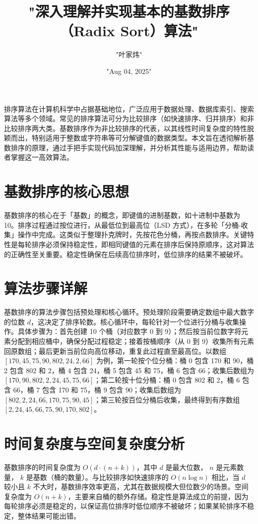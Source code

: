 \title{"深入理解并实现基本的基数排序（Radix Sort）算法"}
\author{"叶家炜"}
\date{"Aug 04, 2025"}
\maketitle
排序算法在计算机科学中占据基础地位，广泛应用于数据处理、数据库索引、搜索算法等多个领域。常见的排序算法可分为比较排序（如快速排序、归并排序）和非比较排序两大类。基数排序作为非比较排序的代表，以其线性时间复杂度的特性脱颖而出，特别适用于整数或字符串等可分解键值的数据类型。本文旨在透彻解析基数排序的原理，通过手把手实现代码加深理解，并分析其性能与适用边界，帮助读者掌握这一高效算法。\par
\chapter{基数排序的核心思想}
基数排序的核心在于「基数」的概念，即键值的进制基数，如十进制中基数为 10。排序过程通过按位进行，从最低位到最高位（LSD 方式），在多轮「分桶-收集」操作中完成。这类似于整理扑克牌时，先按花色分桶，再按点数排序。关键特性是每轮排序必须保持稳定性，即相同键值的元素在排序后保持原顺序，这对算法的正确性至关重要。稳定性确保在后续高位排序时，低位排序的结果不被破坏。\par
\chapter{算法步骤详解}
基数排序的算法步骤包括预处理和核心循环。预处理阶段需要确定数组中最大数字的位数 $d$，这决定了排序轮数。核心循环中，每轮针对一个位进行分桶与收集操作。具体步骤为：首先创建 10 个桶（对应数字 0 到 9）；然后按当前位数字将元素分配到相应桶中，确保分配过程稳定；接着按桶顺序（从 0 到 9）收集所有元素回原数组；最后更新当前位向高位移动，重复此过程直至最高位。以数组 $[170, 45, 75, 90, 802, 24, 2, 66]$ 为例，第一轮按个位分桶：桶 0 包含 170 和 90，桶 2 包含 802 和 2，桶 4 包含 24，桶 5 包含 45 和 75，桶 6 包含 66；收集后数组为 $[170, 90, 802, 2, 24, 45, 75, 66]$；第二轮按十位分桶：桶 0 包含 802 和 2，桶 6 包含 66，桶 7 包含 170 和 75，桶 9 包含 90；收集后数组为 $[802, 2, 24, 66, 170, 75, 90, 45]$；第三轮按百位分桶后收集，最终得到有序数组 $[2, 24, 45, 66, 75, 90, 170, 802]$。\par
\chapter{时间复杂度与空间复杂度分析}
基数排序的时间复杂度为 $O(d \cdot (n + k))$，其中 $d$ 是最大位数， $n$ 是元素数量， $k$ 是基数（桶的数量）。与比较排序如快速排序的 $O(n \log n)$ 相比，当 $d$ 较小且 $k$ 不大时，基数排序效率更高，尤其在数据规模大但位数少的场景。空间复杂度为 $O(n + k)$，主要来自桶的额外存储。稳定性是算法成立的前提，因为每轮排序必须是稳定的，以保证高位排序时低位顺序不被破坏；如果某轮排序不稳定，整体结果可能出错。\par
